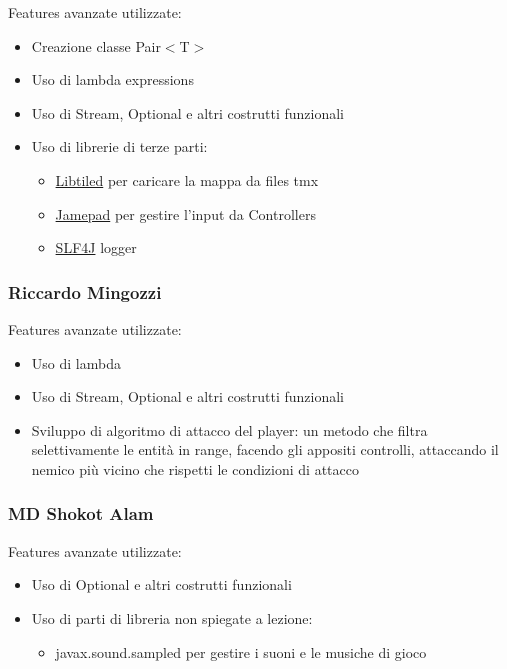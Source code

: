 \documentclass[a4paper,12pt]{report}
\begin{document}
    Features avanzate utilizzate:

    \begin{itemize}
        \item Creazione classe Pair$<$T$>$
        \item Uso di lambda expressions
        \item Uso di Stream, Optional e altri costrutti funzionali
        \item Uso di librerie di terze parti:
        \begin{itemize}
            \item \href{https://github.com/csueiras/libtiled-java}{Libtiled} per caricare la mappa da files tmx
            \item \href{https://github.com/williamahartman/Jamepad}{Jamepad} per gestire l'input da Controllers
            \item \href{https://github.com/qos-ch/slf4j}{SLF4J} logger
        \end{itemize}
    \end{itemize}

    \subsubsection{Riccardo Mingozzi}

    Features avanzate utilizzate:

    \begin{itemize}
        \item Uso di lambda
        \item Uso di Stream, Optional e altri costrutti funzionali
        \item Sviluppo di algoritmo di attacco del player: un metodo che filtra selettivamente le entità in range, facendo gli appositi controlli, attaccando il nemico più vicino che rispetti le condizioni di attacco
    \end{itemize}

    \subsubsection{MD Shokot Alam}

    Features avanzate utilizzate:

    \begin{itemize}
        \item Uso di Optional e altri costrutti funzionali
        \item Uso di parti di libreria non spiegate a lezione:
        \begin{itemize}
            \item javax.sound.sampled per gestire i suoni e le musiche di gioco
        \end{itemize}
    \end{itemize}
\end{document}
